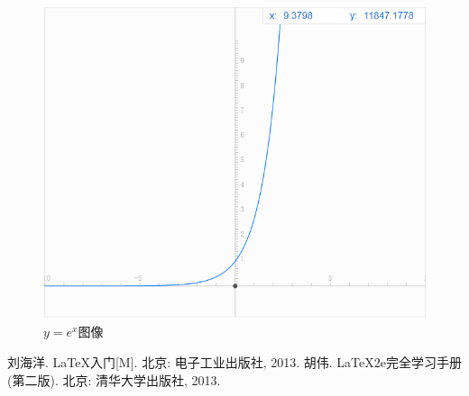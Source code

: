 \documentclass[UTF8]{ctexart}
\begin{document}
\begin{figure}
    \centering
    \includegraphics[width=.7\textwidth]{imgs/ex.png}
    \caption{$y=e^x$图像}
    \label{fig:function}
\end{figure}

\begin{thebibliography}{9}
     刘海洋. \LaTeX 入门[M]. 北京: 电子工业出版社, 2013.
     胡伟. \LaTeX 2e完全学习手册(第二版). 北京: 清华大学出版社, 2013.
\end{thebibliography}
\end{document}

